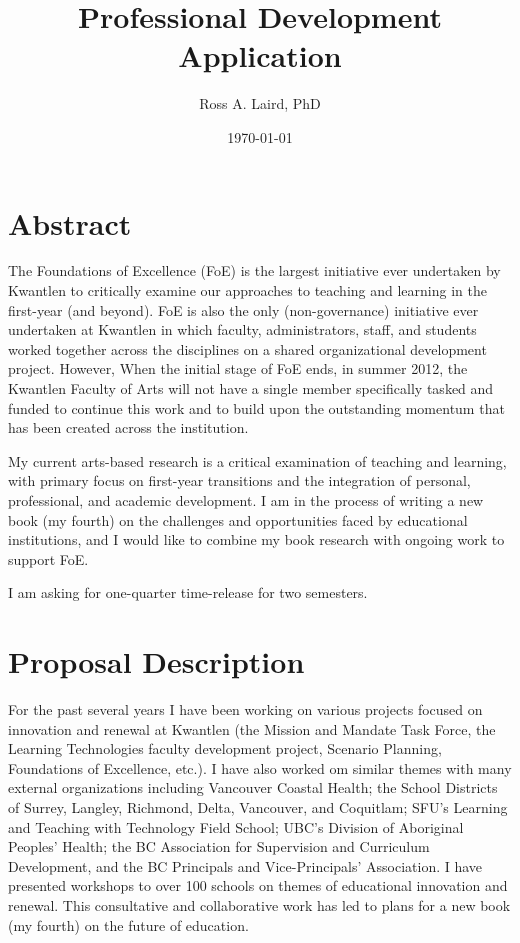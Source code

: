 \documentclass[letterpaper,10pt,headsepline]{scrreprt}
\author{Ross A. Laird, PhD}
\title{Professional Development Application}
\date{\today}
\begin{document}
\begin{titlingpage}
\begin{center}
\maketitle
\end{center}
\end{titlingpage}
\setcounter{tocdepth}{3}
\tableofcontents

\vspace*{1cm}
\section{Abstract}
\label{sec-1}
The Foundations of Excellence (FoE) is the largest initiative ever undertaken by Kwantlen to critically examine our approaches to teaching and learning in the first-year (and beyond). FoE is also the only (non-governance) initiative ever undertaken at Kwantlen in which faculty, administrators, staff, and students worked together across the disciplines on a shared organizational development project. However, When the initial stage of FoE ends, in summer 2012, the Kwantlen Faculty of Arts will not have a single member specifically tasked and funded to continue this work and to build upon the outstanding momentum that has been created across the institution.

My current arts-based research is a critical examination of teaching and learning, with primary focus on first-year transitions and the integration of personal, professional, and academic development. I am in the process of writing a new book (my fourth) on the challenges and opportunities faced by educational institutions, and I would like to combine my book research with ongoing work to support FoE.

I am asking for one-quarter time-release for two semesters.
\section{Proposal Description}
\label{sec-2}

For the past several years I have been working on various projects focused on innovation and renewal at Kwantlen (the Mission and Mandate Task Force, the Learning Technologies faculty development project, Scenario Planning, Foundations of Excellence, etc.). I have also worked om similar themes with many external organizations including Vancouver Coastal Health; the School Districts of Surrey, Langley, Richmond, Delta, Vancouver, and Coquitlam; SFU's Learning and Teaching with Technology Field School; UBC's Division of Aboriginal Peoples' Health; the BC Association for Supervision and Curriculum Development, and the BC Principals and Vice-Principals' Association. I have presented workshops to over 100 schools on themes of educational innovation and renewal. This consultative and collaborative work has led to plans for a new book (my fourth) on the future of education.
\end{document}
